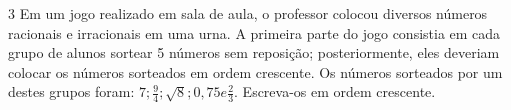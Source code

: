 
\num{3} Em um jogo realizado em sala de aula, o professor colocou
diversos números racionais e irracionais em uma urna. A primeira parte
do jogo consistia em cada grupo de alunos sortear 5 números sem reposição;
posteriormente, eles deveriam colocar os números sorteados em ordem
crescente. Os números sorteados por um destes grupos foram: 
$7; \frac{9}{4} ; \sqrt{8} ; 0,75 e \frac{2}{3}$. Escreva-os em ordem crescente.


